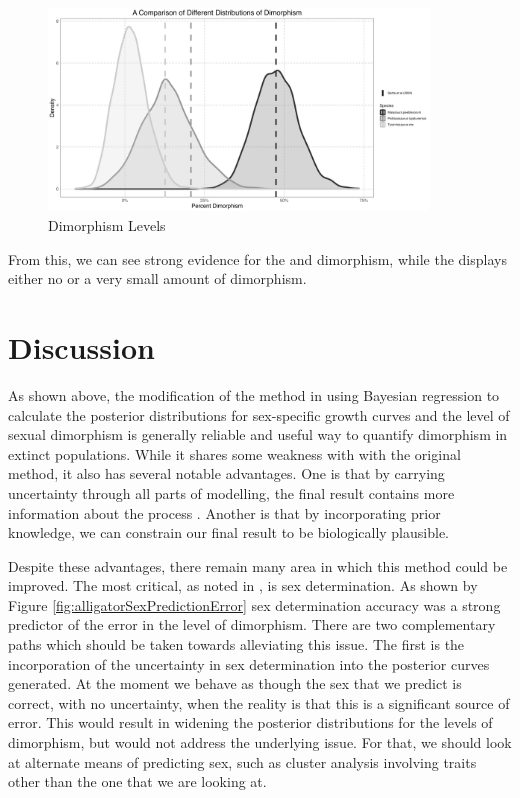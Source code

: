 \documentclass[letterpaper]{article}
\begin{document}
\begin{figure}[H]
	\centering
	\includegraphics[width = 0.9\textwidth]{images/combinedDimorphism.png}
	\caption{Dimorphism Levels}
	\label{fig:combinedDimorphism}
\end{figure}

From this, we can see strong evidence for the \maia{} and \psit{} dimorphism, while the \tyran{} displays either no or a very small amount of dimorphism.

\section{Discussion}

As shown above, the modification of the method in \cite{saittaEffectSizeStatistical2020} using Bayesian regression to calculate the posterior distributions for sex-specific growth curves and the level of sexual dimorphism is generally reliable and useful way to quantify dimorphism in extinct populations. While it shares some weakness with with the original method, it also has several notable advantages. One is that by carrying uncertainty through all parts of modelling, the final result contains more information about the process \parencite{mcelreathStatisticalRethinkingBayesian2020}. Another is that by incorporating prior knowledge, we can constrain our final result to be biologically plausible.

Despite these advantages, there remain many area in which this method could be improved. The most critical, as noted in \cite{saittaEffectSizeStatistical2020}, is sex determination. As shown by Figure \ref{fig:alligatorSexPredictionError} sex determination accuracy was a strong predictor of the error in the level of dimorphism. There are two complementary paths which should be taken towards alleviating this issue. The first is the incorporation of the uncertainty in sex determination into the posterior curves generated. At the moment we behave as though the sex that we predict is correct, with no uncertainty, when the reality is that this is a significant source of error. This would result in widening the posterior distributions for the levels of dimorphism, but would not address the underlying issue. For that, we should look at alternate means of predicting sex, such as cluster analysis involving traits other than the one that we are looking at.
\end{document}
